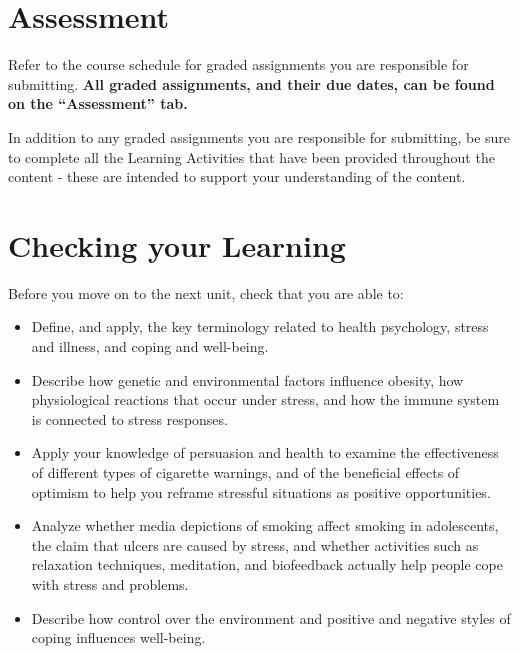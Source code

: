 \documentclass[
]{book}
\begin{document}
\hypertarget{assessment-11}{%
\section*{Assessment}\label{assessment-11}}

\begin{assessment}
Refer to the course schedule for graded assignments you are responsible for submitting. \textbf{All graded assignments, and their due dates, can be found on the ``Assessment'' tab.}

In addition to any graded assignments you are responsible for submitting, be sure to complete all the Learning Activities that have been provided throughout the content - these are intended to support your understanding of the content.
\end{assessment}

\hypertarget{checking-your-learning-11}{%
\section*{Checking your Learning}\label{checking-your-learning-11}}

\begin{progress}
Before you move on to the next unit, check that you are able to:

\begin{itemize}
\item
  Define, and apply, the key terminology related to health psychology, stress and illness, and coping and well-being.
\item
  Describe how genetic and environmental factors influence obesity, how physiological reactions that occur under stress, and how the immune system is connected to stress responses.
\item
  Apply your knowledge of persuasion and health to examine the effectiveness of different types of cigarette warnings, and of the beneficial effects of optimism to help you reframe stressful situations as positive opportunities.
\item
  Analyze whether media depictions of smoking affect smoking in adolescents, the claim that ulcers are caused by stress, and whether activities such as relaxation techniques, meditation, and biofeedback actually help people cope with stress and problems.
\item
  Describe how control over the environment and positive and negative styles of coping influences well-being.
\end{itemize}
\end{progress}
\end{document}
